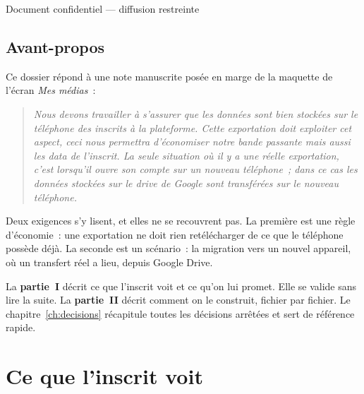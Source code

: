 \documentclass[11pt,a4paper,oneside]{report}
\begin{document}
\begin{titlepage}
\vspace{0.8cm}
\begin{center}\color{AlanyaGray}\small\sffamily
  Document confidentiel --- diffusion restreinte
\end{center}
\end{titlepage}

\chapter*{Avant-propos}
\thispagestyle{plain}

Ce dossier répond à une note manuscrite posée en marge de la maquette de l'écran
\emph{Mes médias}~:

\begin{quote}\itshape
Nous devons travailler à s'assurer que les données sont bien stockées sur le téléphone des
inscrits à la plateforme. Cette exportation doit exploiter cet aspect, ceci nous permettra
d'économiser notre bande passante mais aussi les data de l'inscrit. La seule situation où
il y a une réelle exportation, c'est lorsqu'il ouvre son compte sur un nouveau téléphone~;
dans ce cas les données stockées sur le drive de Google sont transférées sur le nouveau
téléphone.
\end{quote}

Deux exigences s'y lisent, et elles ne se recouvrent pas. La première est une règle
d'économie~: une exportation ne doit rien retélécharger de ce que le téléphone possède
déjà. La seconde est un scénario~: la migration vers un nouvel appareil, où un transfert
réel a lieu, depuis Google Drive.

\begin{note}
La \textbf{partie~I} décrit ce que l'inscrit voit et ce qu'on lui promet. Elle se valide
sans lire la suite. La \textbf{partie~II} décrit comment on le construit, fichier par
fichier. Le chapitre~\ref{ch:decisions} récapitule toutes les décisions arrêtées et sert
de référence rapide.
\end{note}

\tableofcontents

\part{Ce que l'inscrit voit}
\end{document}
